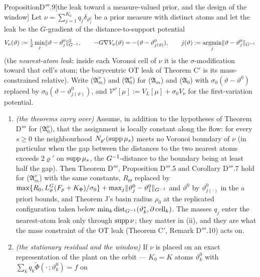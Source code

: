 \begin{thm}{Proposition}{D$'''$.9}[the leak toward a measure-valued prior, and the design of the window]
Let $\nu = \sum_{j=1}^{K_0}q_j\delta_{\vartheta^0_j}$ be a prior measure with distinct atoms and let the leak be the
$G$-gradient of the distance-to-support potential
\[
  V_\nu(\vartheta) := \tfrac12\min_j\lVert \vartheta - \vartheta^0_j\rVert^2_{G^{-1}},\qquad
  -G\nabla V_\nu(\vartheta) = -(\vartheta - \vartheta^0_{j(\vartheta)}),\qquad
  j(\vartheta) := \operatorname*{argmin}_j\lVert \vartheta - \vartheta^0_j\rVert_{G^{-1}}
\]
(the \emph{nearest-atom leak}: inside each Voronoi cell of $\nu$ it is the $\sigma$-modification toward that cell's
atom; the barycentric OT leak of Theorem C$'$ is its mass-constrained relative). Write
\textup{($\mathfrak{A}_m^\nu$)} and \textup{($\mathfrak{A}_0^\nu$)} for \textup{($\mathfrak{A}_m$)} and
\textup{($\mathfrak{A}_0$)} with $\sigma_0(\vartheta - \vartheta^0)$ replaced by
$\sigma_0(\vartheta - \vartheta^0_{j(\vartheta)})$, and $\mathcal{V}^\nu[\mu] := V_L[\mu] + \sigma_0V_\nu$ for the
first-variation potential.
\begin{enumerate}[label=\textup{(\roman*)}]
  \item \emph{(the theorems carry over)} Assume, in addition to the hypotheses of Theorem D$'''$ for
    \textup{($\mathfrak{A}_0^\nu$)}, that the assignment is locally constant along the flow: for every $s\ge0$ the
    neighbourhood $N_{\varrho'}(\operatorname{supp}\mu_s)$ meets no Voronoi boundary of $\nu$ (in particular when the gap between
    the distances to the two nearest atoms exceeds $2\varrho'$ on $\operatorname{supp}\mu_s$, the $G^{-1}$-distance to the boundary
    being at least half the gap). Then Theorem D$'''$, Proposition D$'''$.5 and Corollary D$'''$.7 hold for
    \textup{($\mathfrak{A}_m^\nu$)} with the same constants, $R_\Theta$ replaced by
    $\max\{R_0, L_\vartheta^G(F_\rho + K_\Phi)/\sigma_0\} + \max_j\lVert \vartheta^0_j - \vartheta^0_1\rVert_{G^{-1}}$ and
    $\vartheta^0$ by $\vartheta^0_{j(\cdot)}$ in the a priori bounds, and Theorem J's basin radius $\rho_0$ at the
    replicated configuration taken below $\min_k\operatorname{dist}_{G^{-1}}(\vartheta^*_k,\partial\,\mathrm{cell}_k)$.
    The masses $q_j$ enter the nearest-atom leak only through $\operatorname{supp}\nu$; they matter in (ii), and they are what the
    mass constraint of the OT leak (Theorem C$'$, Remark D$'''$.10) acts on.
  \item \emph{(the stationary residual and the window)} If $\nu$ is placed on an exact representation of the plant
    on the orbit --- $K_0 = K$ atoms $\vartheta^0_k$ with $\sum_kq_k\tilde\Phi(\cdot\,;\vartheta^0_k) = f$ on

\end{enumerate}
\end{thm}
